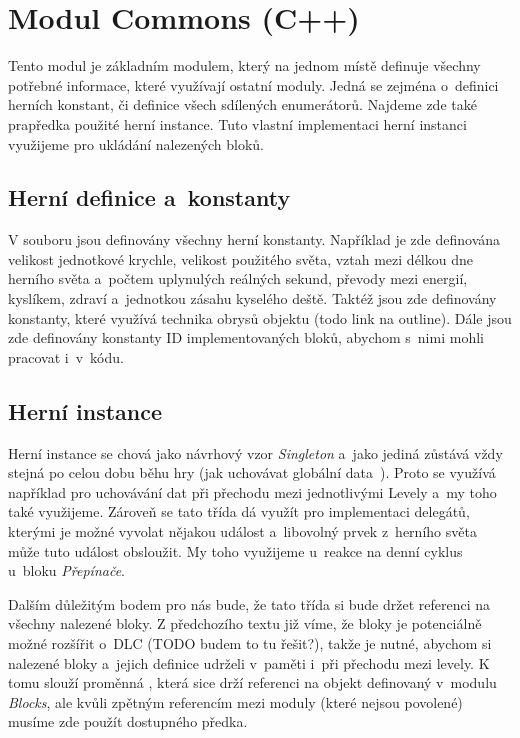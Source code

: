 
\section{Modul Commons (C++)}

Tento modul je základním modulem, který na jednom místě definuje všechny potřebné informace, které využívají ostatní moduly. Jedná se zejména o~definici herních konstant, či definice všech sdílených enumerátorů. Najdeme zde také prapředka použité herní instance. Tuto vlastní implementaci herní instanci využijeme pro ukládání nalezených bloků.

\subsection{Herní definice a~konstanty}



V souboru jsou definovány všechny herní konstanty. Například je zde definována velikost jednotkové krychle, velikost použitého světa, vztah mezi délkou dne herního světa a~počtem uplynulých reálných sekund, převody mezi energií, kyslíkem, zdraví a~jednotkou zásahu kyselého deště. Taktéž jsou zde definovány konstanty, které využívá technika obrysů objektu (todo link na outline). Dále jsou zde definovány konstanty ID implementovaných bloků, abychom s~nimi mohli pracovat i~v~kódu.

\subsection{Herní instance}

Herní instance  se chová jako návrhový vzor \textit{Singleton} a~jako jediná zůstává vždy stejná po celou dobu běhu hry (jak uchovávat globální data~\citep{ue_gameInstance}). Proto se využívá například pro uchovávání dat při přechodu mezi jednotlivými Levely a~my toho také využijeme. Zároveň se tato třída dá využít pro implementaci delegátů, kterými je možné vyvolat nějakou událost a~libovolný prvek z~herního světa může tuto událost obsloužit. My toho využijeme u~reakce na denní cyklus u~bloku \textit{Přepínače}.

Dalším důležitým bodem pro nás bude, že tato třída si bude držet referenci na všechny nalezené bloky. Z předchozího textu již víme, že bloky je potenciálně možné rozšířit o~DLC (TODO budem to tu řešit?), takže je nutné, abychom si nalezené bloky a~jejich definice udrželi v~paměti i~při přechodu mezi levely. K tomu slouží proměnná , která sice drží referenci na objekt definovaný v~modulu \textit{Blocks}, ale kvůli zpětným referencím mezi moduly (které nejsou povolené) musíme zde použít dostupného předka.

